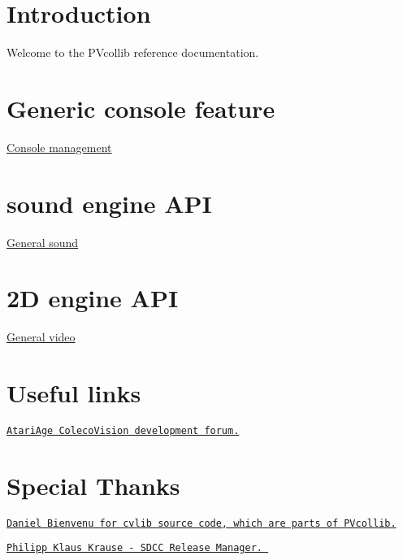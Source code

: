\hypertarget{index_intro}{}\section{Introduction}\label{index_intro}
Welcome to the P\+Vcollib reference documentation.\hypertarget{index_console_mngt}{}\section{Generic console feature}\label{index_console_mngt}

\begin{DoxyItemize}
\item \hyperlink{a00047}{Console management}
\end{DoxyItemize}\hypertarget{index_sound_sn76489}{}\section{sound engine A\+PI}\label{index_sound_sn76489}

\begin{DoxyItemize}
\item \hyperlink{a00053_source}{General sound}
\end{DoxyItemize}\hypertarget{index_video_tms9918}{}\section{2\+D engine A\+PI}\label{index_video_tms9918}

\begin{DoxyItemize}
\item \hyperlink{a00056}{General video}
\end{DoxyItemize}\hypertarget{index_external_links}{}\section{Useful links}\label{index_external_links}

\begin{DoxyItemize}
\item \href{http://atariage.com/forums/forum/55-colecovision-programming/}{\tt Atari\+Age Coleco\+Vision development forum.}
\end{DoxyItemize}\hypertarget{index_special_thanks}{}\section{Special Thanks}\label{index_special_thanks}

\begin{DoxyItemize}
\item \href{http://ccjvq.com/newcoleco/indexfr.html}{\tt Daniel Bienvenu for cvlib source code, which are parts of P\+Vcollib.}
\item \href{https://sourceforge.net/projects/sdcc/files/}{\tt Philipp Klaus Krause -\/ S\+D\+CC Release Manager. } 
\end{DoxyItemize}